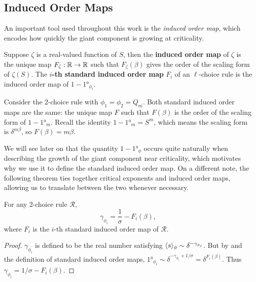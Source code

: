 \documentclass[twoside,10pt]{article}
\begin{document}
\subsection{Induced Order Maps}

An important tool used throughout this work is the \emph{induced order map}, which encodes how quickly the giant component is growing at criticality.


\begin{defn}[]
	Suppose $\zeta$ is a real-valued function of $S$, then the \textbf{induced order map} of $\zeta$ is the unique map $F_{\zeta}:\mathbb{R}\to \mathbb{R}$ such that $F_{\zeta}(\beta)$ gives the order of the scaling form of $\zeta(S)$. The \textbf{$i$-th standard induced order map} $F_{i}$ of an $\ell$-choice rule is the induced order map of $1 - \ang{1}_{\phi_{i}}$.
\end{defn}

\begin{ex}[]
	Consider the 2-choice rule with $\phi_1 = \phi_2 = Q_{m}$. Both standard induced order maps are the same: the unique map $F$ such that $F(\beta)$ is the order of the scaling form of $1 - \ang{1}_{m}$. Recall the identity $1-\ang{1}_{m}= S^{m}$, which means the scaling form is $\delta^{m \beta}$, so $F(\beta) = m\beta$.
\end{ex}

We will see later on that the quantity $1-\ang{1}_{\phi}$ occurs quite naturally when describing the growth of the giant component near criticality, which motivates why we use it to define the standard induced order map. On a different note, the following theorem ties together critical exponents and induced order maps, allowing us to translate between the two whenever necessary.

\begin{prop}
	\label{exponent-to-induced-map}
	For any 2-choice rule $\mathcal{R}$,
	\[
		\gamma_{\phi_{i}} = \frac{1}{\sigma} - F_{i}(\beta),
	\] where $F_{i}$ is the $i$-th standard induced order map of $\mathcal{R}$.
\end{prop}
\begin{proof}
	$\gamma_{\phi_i}$ is defined to be the real number satisfying $\langle s \rangle_{\phi} \sim \delta^{-\gamma_{\phi_i}}$. But by  and the definition of standard induced order maps, $\ang{1}_{\phi_{i}} \sim \delta^{-\gamma_{\phi_i}+1/\sigma} = \delta^{F_{i}(\beta)}$. Thus $\gamma_{\phi_i} = 1/\sigma - F_{i}(\beta)$.
\end{proof}
\end{document}
